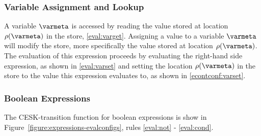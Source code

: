 \documentclass[a4paper,oneside,fleqn]{article}
\begin{document}
\subsubsection{Variable Assignment and Lookup}
\label{subsubsec:variable-assignment-and-lookup}

A variable $\varmeta$ is accessed by reading the value stored at location $\env(\varmeta)$ in the store, \eqref{eval:varget}.
Assigning a value to a variable $\varmeta$ will modify the store, more specifically the value stored at location  $\env(\varmeta)$.
The evaluation of this expression proceeds by evaluating the right-hand side expression, as shown in \eqref{eval:varset} and setting the location $\env(\varmeta)$ in the store to the value this expression evaluates to, as shown in \eqref{econtconf:varset}.


\subsubsection{Boolean Expressions}
\label{subsubsec:bool-expressions}

The CESK-transition function for boolean expressions is show in Figure~\ref{figure:expressions-evalconfigs}, rules \eqref{eval:not} - \eqref{eval:cond}.
\end{document}
